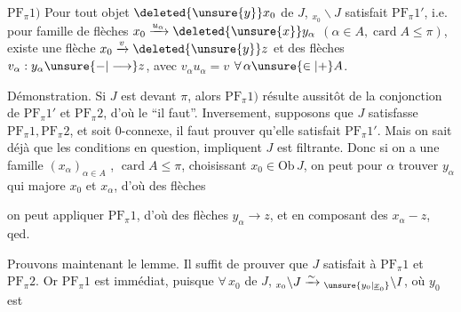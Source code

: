 $\mathrm{PF}_\pi1)$ Pour tout objet $\deleted{\unsure{y}}x_0$ de $J$, $ {}_{x_0}\backslash J$ satisfait $\mathrm{PF}_\pi1'$, i.e. pour  famille de flèches $x_0\xrightarrow{u_\alpha}\deleted{\unsure{x}}y_\alpha$ $(\alpha\in A,\operatorname{card} A\leq\pi)$, existe une  flèche $x_0\xrightarrow{v}\deleted{\unsure{y}}z$ et des flèches $v_\alpha:y_\alpha\unsure{\mathbin{-}|\longrightarrow}z$, avec $v_\alpha u_\alpha=v$ $\forall\,\alpha\unsure{\in|+} A$.

Démonstration. Si $J$ est  devant $\pi$, alors  $\mathrm{PF}_\pi1)$ résulte aussitôt de la conjonction de $\mathrm{PF}_\pi1'$ et $\mathrm{PF}_\pi2$, d'où le ``il faut''. Inversement, supposons que $J$ satisfasse $\mathrm{PF}_\pi1,\mathrm{PF}_\pi2$, et soit $0$-connexe, il faut prouver qu'elle satisfait $\mathrm{PF}_\pi1'$. Mais on sait déjà que les conditions en question,  impliquent     $J$ est filtrante. Donc si on a une famille $(x_\alpha)_{\alpha\in A}$ , $\operatorname{card} A\leq\pi$, choisissant  $x_0\in\mathrm{Ob}\,J$, on peut pour  $\alpha$ trouver $y_\alpha$ qui majore $x_0$ et $x_\alpha$, d'où des flèches


on peut  appliquer $\mathrm{PF}_\pi1$, d'où des flèches $y_\alpha\longrightarrow z$, et en composant des $x_\alpha\mathbin{-}z$, qed.

 Prouvons maintenant le lemme. Il  suffit  de prouver que $J$ satisfait à $\mathrm{PF}_\pi1$ et $\mathrm{PF}_\pi2$. Or $\mathrm{PF}_\pi1$ est immédiat, puisque $\forall\,x_0$ de $J$, $ {}_{x_0}\backslash J\xrightarrow{\sim}{}_{\unsure{y_0|\underline{x}_0}}\backslash I$, où $y_0$ est


